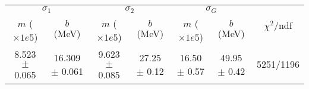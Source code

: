 \begin{tabular}{cc|cc|cc||c}
\multicolumn{2}{c|}{$\sigma_1$} & \multicolumn{2}{|c}{$\sigma_2$} & \multicolumn{2}{|c}{$\sigma_G$}  & \multirow{2}{*}{$\chi^2/$ndf}\\
$m$ ($\times1e5$) & $b$ (MeV) & $m$ ($\times1e5$) & $b$ (MeV) & $m$ ($\times1e5$) & $b$ (MeV) & \\
\hline
8.523 $\pm$ 0.065 & 16.309 $\pm$ 0.061 & 9.623 $\pm$ 0.085 & 27.25 $\pm$ 0.12 & 16.50 $\pm$ 0.57 & 49.95 $\pm$ 0.42 & 5251/1196\\
\end{tabular}
